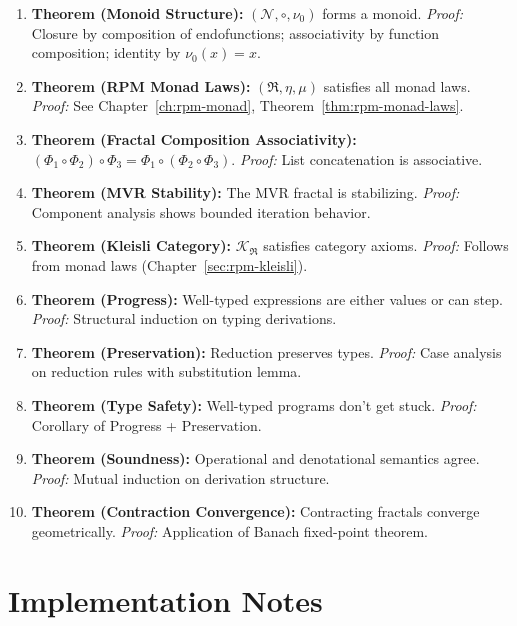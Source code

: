 \documentclass[11pt,twoside,openright]{book}
\theoremstyle{definition}
\theoremstyle{plain}
\theoremstyle{remark}
\newcommand{\Noetics}{\mathcal{N}}
\newcommand{\noe}[1]{\nu_{#1}}
\newcommand{\RPM}{\mathfrak{R}}
\newcommand{\Frac}{\Phi}
\newcommand{\Kleisli}{\mathcal{K}}
\begin{document}
\begin{enumerate}
\item \textbf{Theorem (Monoid Structure):} $(\Noetics, \circ, \noe{0})$ forms a monoid. \textit{Proof:} Closure by composition of endofunctions; associativity by function composition; identity by $\noe{0}(x) = x$.

\item \textbf{Theorem (RPM Monad Laws):} $(\RPM, \eta, \mu)$ satisfies all monad laws. \textit{Proof:} See Chapter~\ref{ch:rpm-monad}, Theorem~\ref{thm:rpm-monad-laws}.

\item \textbf{Theorem (Fractal Composition Associativity):} $(\Frac_1 \circ \Frac_2) \circ \Frac_3 = \Frac_1 \circ (\Frac_2 \circ \Frac_3)$. \textit{Proof:} List concatenation is associative.

\item \textbf{Theorem (MVR Stability):} The MVR fractal is stabilizing. \textit{Proof:} Component analysis shows bounded iteration behavior.

\item \textbf{Theorem (Kleisli Category):} $\Kleisli_\RPM$ satisfies category axioms. \textit{Proof:} Follows from monad laws (Chapter~\ref{sec:rpm-kleisli}).

\item \textbf{Theorem (Progress):} Well-typed expressions are either values or can step. \textit{Proof:} Structural induction on typing derivations.

\item \textbf{Theorem (Preservation):} Reduction preserves types. \textit{Proof:} Case analysis on reduction rules with substitution lemma.

\item \textbf{Theorem (Type Safety):} Well-typed programs don't get stuck. \textit{Proof:} Corollary of Progress + Preservation.

\item \textbf{Theorem (Soundness):} Operational and denotational semantics agree. \textit{Proof:} Mutual induction on derivation structure.

\item \textbf{Theorem (Contraction Convergence):} Contracting fractals converge geometrically. \textit{Proof:} Application of Banach fixed-point theorem.
\end{enumerate}

\chapter{Implementation Notes}
\label{app:implementation}
\end{document}
